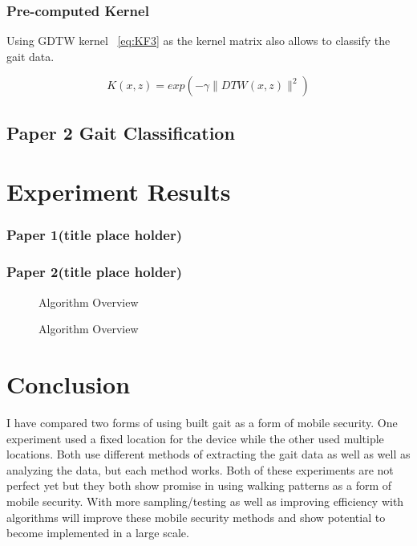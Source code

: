 \documentclass{sig-alternate}
\begin{document}
\subsubsection{Pre-computed Kernel}
Using GDTW kernel ~\ref{eq:KF3} as the kernel matrix also allows to classify the gait data.

\begin{displaymath}
K(x,z)=exp(-\gamma \parallel DTW(x,z) \parallel ^2)
\label{eq:KF3}
\end{displaymath}

\subsection{Paper 2 Gait Classification}
\section{Experiment Results}
\subsubsection{Paper 1(title place holder)}
\subsubsection{Paper 2(title place holder)}

\begin{figure}
\centering
{}
\caption{Algorithm Overview}
\label{fig:Paper1Summary}
\end{figure}

\begin{figure*}
\centering
{}
\caption{Algorithm Overview}
\label{fig:Paper2Summary}
\end{figure*}
\section{Conclusion}
I have compared two forms of using built gait as a form of mobile security. One experiment used a fixed location for the device while the other used multiple locations. Both use different methods of extracting the gait data as well as well as analyzing the data, but each method works. Both of these experiments are not perfect yet but they both show promise in using walking patterns as a form of mobile security. With more sampling/testing as well as improving efficiency with algorithms will improve these mobile security methods and show potential to become implemented in a large scale.
\end{document}
